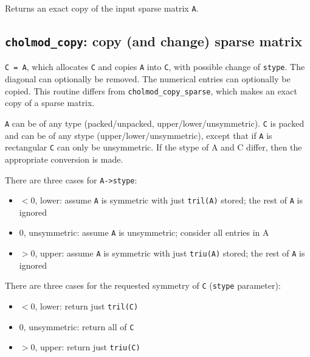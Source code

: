 \documentclass[11pt]{article}
\begin{document}

Returns an exact copy of the input sparse matrix {\tt A}.

\newpage \subsection{{\tt cholmod\_copy}: copy (and change) sparse matrix}


{\tt C = A}, which allocates {\tt C} and copies {\tt A} into {\tt C}, with possible change of
{\tt stype}.  The diagonal can optionally be removed.  The numerical entries
can optionally be copied.  This routine differs from {\tt cholmod\_copy\_sparse},
which makes an exact copy of a sparse matrix.

{\tt A} can be of any type (packed/unpacked, upper/lower/unsymmetric).  {\tt C} is
packed and can be of any stype (upper/lower/unsymmetric), except that if
{\tt A} is rectangular {\tt C} can only be unsymmetric.  If the stype of A and C
differ, then the appropriate conversion is made.

\noindent
There are three cases for {\tt A->stype}:
\begin{itemize}
\item $<0$,  lower: assume {\tt A} is symmetric with just {\tt tril(A)} stored; the rest of {\tt A} is ignored
\item $ 0$,  unsymmetric: assume {\tt A} is unsymmetric; consider all entries in A
\item $>0$,  upper: assume {\tt A} is symmetric with just {\tt triu(A)} stored; the rest of {\tt A} is ignored
\end{itemize}

\noindent
There are three cases for the requested symmetry of {\tt C} ({\tt stype} parameter):
\begin{itemize}
\item $<0$,  lower: return just {\tt tril(C)}
\item $0$,   unsymmetric: return all of {\tt C}
\item $>0$,  upper: return just {\tt triu(C)}
\end{itemize}
\end{document}

